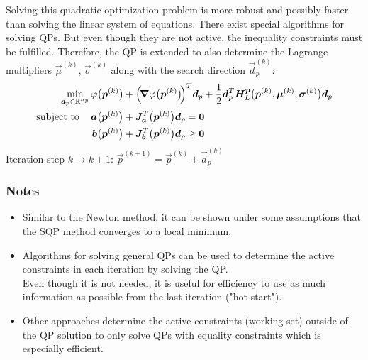 				Solving this quadratic optimization problem is more robust and possibly faster than solving the linear system of equations. There exist special algorithms for solving QPs. But even though they are not active, the inequality constraints must be fulfilled. Therefore, the QP is extended to also determine the Lagrange multipliers \( \vec{\mu}^{(k)} \), \( \vec{\sigma}^{(k)} \) along with the search direction \( \vec{d}_p^{(k)} \):
				\begin{align}
					\min_{\bm{d}_p \in \mathbb{R}^{n_p}} &\, \varphi\big(\bm{p}^{(k)}\big) + \Big(\!\grad{\varphi}\big(\bm{p}^{(k)}\big)\!\Big)^T \bm{d}_p + \frac{1}{2} \bm{d}_p^T \bm{H}_L^{\bm{p}}\big(\bm{p}^{(k)}, \bm{\mu}^{(k)}, \bm{\sigma}^{(k)}\big) \bm{d}_p \\
					\mathrm{subject~to}\quad &\,
						\begin{alignedat}[t]{2}
							\bm{a}\big(\bm{p}^{(k)}\big) + \bm{J}_{\bm{a}}^T\big(\bm{p}^{(k)}\big) \bm{d}_p &= \bm{0} \\
							\bm{b}\big(\bm{p}^{(k)}\big) + \bm{J}_{\bm{b}}^T\big(\bm{p}^{(k)}\big) \bm{d}_p & \geq \bm{0}
						\end{alignedat}  \label{eq:qp}
				\end{align}
				Iteration step \( k \to k + 1 \): \( \vec{p}^{(k + 1)} = \vec{p}^{(k)} + \vec{d}_p^{(k)} \)

			\subsubsection{Notes}
				\begin{itemize}
					\item Similar to the Newton method, it can be shown under some assumptions that the SQP method converges to a local minimum.
					\item Algorithms for solving general QPs can be used to determine the active constraints in each iteration by solving the QP. \\ Even though it is not needed, it is useful for efficiency to use as much information as possible from the last iteration ("hot start").
					\item Other approaches determine the active constraints (working set) outside of the QP solution to only solve QPs with equality constraints which is especially efficient.
				\end{itemize}

